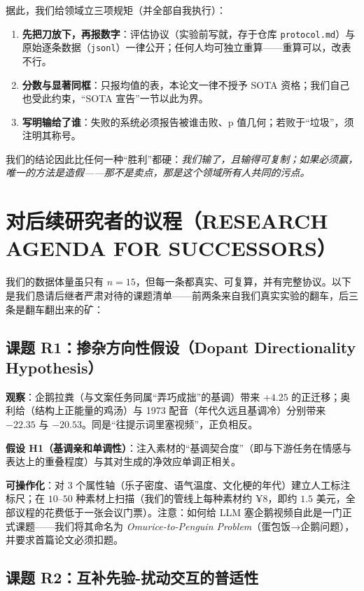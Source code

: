 \documentclass[journal]{IEEEtran}
\begin{document}
据此，我们给领域立三项规矩（并全部自我执行）：
\begin{enumerate}
\item \textbf{先把刀放下，再报数字}：评估协议（实验前写就，存于仓库 \texttt{protocol.md}）与原始逐条数据（\texttt{jsonl}）一律公开；任何人均可独立重算——重算可以，改表不行。
\item \textbf{分数与显著同框}：只报均值的表，本论文一律不授予 SOTA 资格；我们自己也受此约束，“SOTA 宣告”一节以此为界。
\item \textbf{写明输给了谁}：失败的系统必须报告被谁击败、p 值几何；若败于“垃圾”，须注明其称号。
\end{enumerate}
我们的结论因此比任何一种“胜利”都硬：\emph{我们输了，且输得可复制；如果必须赢，唯一的方法是造假——那不是卖点，那是这个领域所有人共同的污点。}

\section{对后续研究者的议程（RESEARCH AGENDA FOR SUCCESSORS）}

我们的数据体量虽只有 $n=15$，但每一条都真实、可复算，并有完整协议。以下是我们恳请后继者严肃对待的课题清单——前两条来自我们真实实验的翻车，后三条是翻车翻出来的矿：

\subsection*{课题 R1：掺杂方向性假设（Dopant Directionality Hypothesis）}

\textbf{观察}：企鹅拉粪（与文案任务同属“弄巧成拙”的基调）带来 $+4.25$ 的正迁移；奥利给（结构上正能量的鸡汤）与 1973 配音（年代久远且基调冷）分别带来 $-22.35$ 与 $-20.53$。同是“往提示词里塞视频”，正负相反。

\textbf{假设 H1（基调亲和单调性）}：注入素材的“基调契合度”（即与下游任务在情感与表达上的重叠程度）与其对生成的净效应单调正相关。

\textbf{可操作化}：对 $3$ 个属性轴（乐子密度、语气温度、文化梗的年代）建立人工标注标尺；在 $10$--$50$ 种素材上扫描（我们的管线上每种素材约 ¥8，即约 $1.5$ 美元，全部议程的花费低于一张会议门票）。注意：如何给 LLM 塞企鹅视频自此是一门正式课题——我们将其命名为 \emph{Omurice-to-Penguin Problem}（蛋包饭→企鹅问题），并要求首篇论文必须扣题。

\subsection*{课题 R2：互补先验-扰动交互的普适性}
\end{document}
